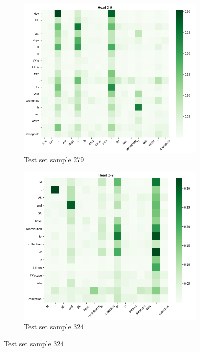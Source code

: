 \documentclass{dcthesis}
\theoremstyle{definition}
\theoremstyle{remark}
\begin{document}
\begin{figure}
  \centering
  \begin{subfigure}[b]{0.5\textwidth}
    \includegraphics[width=1\linewidth]{head_3-9_1.png}
    \caption{Test set sample 279}
    \label{fig:head_3-9_1} 
  \end{subfigure}%
  \begin{subfigure}[b]{0.5\textwidth}
    \includegraphics[width=1\linewidth]{head_3-9_2.png}
    \caption{Test set sample 324}
    \label{fig:head_3-9_2} 
  \end{subfigure}\vspace{10mm}


\end{figure}
\end{document}
